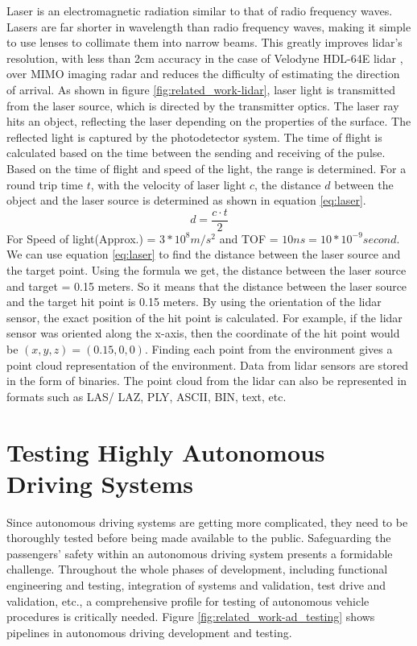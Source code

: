 Laser is an electromagnetic radiation similar to that of radio frequency waves. Lasers are far shorter in wavelength than radio frequency waves, making it simple to use lenses to collimate them into narrow beams. This greatly improves lidar's resolution, with less than 2cm accuracy in the case of Velodyne HDL-64E lidar \parencite{velodyne_64}, over MIMO imaging radar and reduces the difficulty of estimating the direction of arrival. As shown in figure \ref{fig:related_work-lidar}, laser light is transmitted from the laser source, which is directed by the transmitter optics. The laser ray hits an object, reflecting the laser depending on the properties of the surface. The reflected light is captured by the photodetector system. The time of flight is calculated based on the time between the sending and receiving of the pulse. Based on the time of flight and speed of the light, the range is determined. For a round trip time \(t\), with the velocity of laser light \(c\), the distance \(d\) between the object and the laser source is determined as shown in equation \ref{eq:laser}.
\begin{equation}\label{eq:laser}
    d = \frac{c \cdot t}{2}
\end{equation}
For Speed of light(Approx.) = \(3 * 10^8 m/s^2\) and TOF = \(10 ns = 10 * 10^{-9} second\). We can use equation \ref{eq:laser} to find the distance between the laser source and the target point. Using the formula we get, the distance between the laser source and target = 0.15 meters. So it means that the distance between the laser source and the target hit point is 0.15 meters. By using the orientation of the lidar sensor, the exact position of the hit point is calculated. For example, if the lidar sensor was oriented along the x-axis, then the coordinate of the hit point would be \((x, y, z) = (0.15, 0, 0)\). Finding each point from the environment gives a point cloud representation of the environment. Data from lidar sensors are stored in the form of binaries. The point cloud from the lidar can also be represented in formats such as LAS/ LAZ, PLY, ASCII, BIN, text, etc.

\section{Testing Highly Autonomous Driving Systems}
Since autonomous driving systems are getting more complicated, they need to be thoroughly tested before being made available to the public. Safeguarding the passengers' safety within an autonomous driving system presents a formidable challenge. Throughout the whole phases of development, including functional engineering and testing, integration of systems and validation, test drive and validation, etc., a comprehensive profile for testing of autonomous vehicle procedures is critically needed. Figure \ref{fig:related_work-ad_testing} shows pipelines in autonomous driving development and testing.

